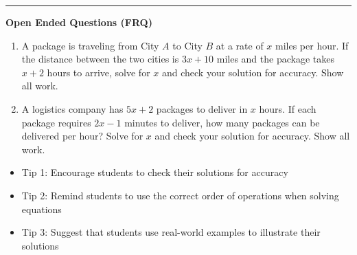 \documentclass[10pt]{article}
\begin{document}
\vspace{-0.2cm}
\hrule
\vspace{0.2cm}
\textbf{\small Open Ended Questions (FRQ)}
\begin{enumerate}[label=\textbf{Q\arabic*.}, start=9, itemsep=5pt, topsep=0pt]

  \item \small A package is traveling from City $A$ to City $B$ at a rate of $x$ miles per hour. If the distance between the two cities is $3x + 10$ miles and the package takes $x + 2$ hours to arrive, solve for $x$ and check your solution for accuracy. Show all work. \vspace{2cm}

  \item \small A logistics company has $5x + 2$ packages to deliver in $x$ hours. If each package requires $2x - 1$ minutes to deliver, how many packages can be delivered per hour? Solve for $x$ and check your solution for accuracy. Show all work. \vspace{2cm}

\end{enumerate}

\vfill

\begin{tcolorbox}[colback=blue!5, colframe=mainblue!50, title=\small \textbf{Chef's Tips}, fonttitle=\bfseries, bottom=1mm]
\begin{itemize}[noitemsep, topsep=2pt, leftmargin=0.5cm]
  \item \scriptsize Tip 1: Encourage students to check their solutions for accuracy\item \scriptsize Tip 2: Remind students to use the correct order of operations when solving equations\item \scriptsize Tip 3: Suggest that students use real-world examples to illustrate their solutions
\end{itemize}
\end{tcolorbox}
\end{document}
